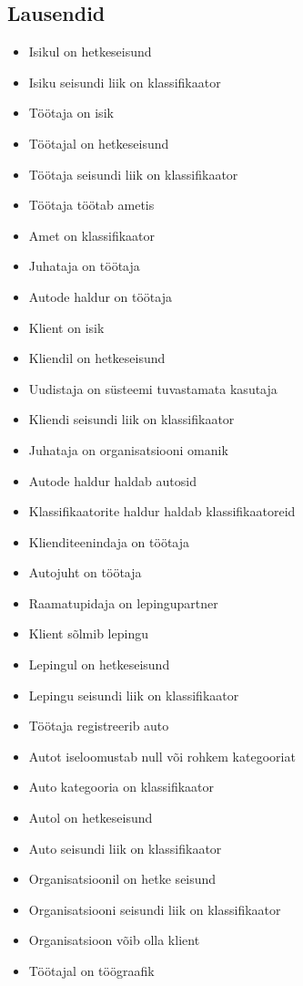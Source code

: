 \documentclass{report}
\begin{document}
\subsection{Lausendid}
\begin{itemize}
	\item Isikul on hetkeseisund
	\item Isiku seisundi liik on klassifikaator
	\item Töötaja on isik
	\item Töötajal on hetkeseisund
	\item Töötaja seisundi liik on klassifikaator
	\item Töötaja töötab ametis
	\item Amet on klassifikaator
	\item Juhataja on töötaja
	\item Autode haldur on töötaja
	\item Klient on isik
	\item Kliendil on hetkeseisund
	\item Uudistaja on süsteemi tuvastamata kasutaja
	\item Kliendi seisundi liik on klassifikaator
	\item Juhataja on organisatsiooni omanik
	\item Autode haldur haldab autosid
	\item Klassifikaatorite haldur haldab klassifikaatoreid
	\item Klienditeenindaja on töötaja
	\item Autojuht on töötaja
	\item Raamatupidaja on lepingupartner
	\item Klient sõlmib lepingu
	\item Lepingul on hetkeseisund
	\item Lepingu seisundi liik on klassifikaator
	\item Töötaja registreerib auto
	\item Autot iseloomustab null või rohkem kategooriat
	\item Auto kategooria on klassifikaator
	\item Autol on hetkeseisund
	\item Auto seisundi liik on klassifikaator
	\item Organisatsioonil on hetke seisund
	\item Organisatsiooni seisundi liik on klassifikaator
	\item Organisatsioon võib olla klient
	\item Töötajal on töögraafik

\end{itemize}
\end{document}
